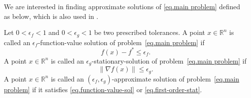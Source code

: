 \documentclass{article}
\begin{document}
We are interested in finding approximate solutions of \eqref{eq.main problem} defined as below, which is also used in \citet{monteiro2013accelerated}.
\begin{definition}
    \label{def.approximate solution}
    Let $0<\epsilon_f<1$ and $0<\epsilon_g<1$ be two prescribed tolerances. A point $x\in\mathbb{R}^n$ is called an
    $\epsilon_f$-function-value solution of problem~\eqref{eq.main problem} if
    \begin{equation}\label{eq.function-value-sol}
        f(x)-f^* \leq \epsilon_f.
    \end{equation}
    A point $x\in\mathbb{R}^n$ is called an
    $\epsilon_g$-stationary-solution of problem~\eqref{eq.main problem} if
    \begin{equation}\label{eq.first-order-stat}
        \|\nabla f(x)\| \leq \epsilon_g.
    \end{equation}
    A point $x\in\mathbb{R}^n$ is called an
    $(\epsilon_f,\epsilon_g)$-approximate solution of problem~\eqref{eq.main problem} if it satisfies \eqref{eq.function-value-sol} or \eqref{eq.first-order-stat}.
\end{definition}
\end{document}
